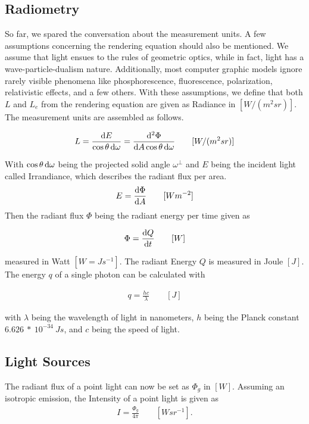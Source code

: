 \subsection{Radiometry}


So far, we spared the conversation about the measurement units. A few assumptions concerning the rendering equation should also be mentioned. We assume that light ensues to the rules of geometric optics, while in fact, light has a wave-particle-dualism nature. Additionally, most computer graphic models ignore rarely visible phenomena like phosphorescence, fluorescence, polarization, relativistic effects, and a few others. With these assumptions, we define that both $L$ and $L_e$ from the rendering equation are given as Radiance in $[W / (m^2sr)]$. The measurement units are assembled as follows.

\begin{align}
L = \frac{\mathop{}\!\mathrm{d} E}{\cos \theta \mathop{}\!\mathrm{d}\omega} = \frac{\mathop{}\!\mathrm{d}^2\Phi}{\mathop{}\!\mathrm{d} A\cos \theta \mathop{}\!\mathrm{d}\omega} \qquad [W / (m^2 sr) ]
\end{align}


With $\cos \theta \mathop{}\!\mathrm{d}\omega$ being the projected solid angle $\omega^\perp$ and $E$ being the incident light called Irrandiance, which describes the radiant flux per area.
\begin{align}
E = \frac{ \mathop{}\!\mathrm{d} \Phi }{ \mathop{}\!\mathrm{d} A } \qquad [W m^{-2} ]
\end{align}
Then the radiant flux $\Phi$ being the radiant energy per time given as

\begin{align}
 \Phi = \frac{\mathop{}\!\mathrm{d} Q}{\mathop{}\!\mathrm{d} t} \qquad [W]   
\end{align}

measured in Watt $[W = Js^{-1} ]$. The radiant Energy $Q$ is measured in Joule $[J]$. The energy $q$ of a single photon can be calculated with 

\begin{align}
 q = \frac{hc}{\lambda} \qquad [J]   
\end{align}

with $\lambda$ being the wavelength of light in nanometers, $h$ being the Planck constant $6.626~*~10^{-34}~Js$, and $c$ being the speed of light.

\subsection{Light Sources}


The radiant flux of a point light can now be set as $\Phi_g$ in $[W]$. Assuming an isotropic emission, the Intensity of a point light is given as
\begin{align}
 I = \frac{\Phi_g}{4\pi} \qquad [ W sr^{-1} ] .
\end{align}

